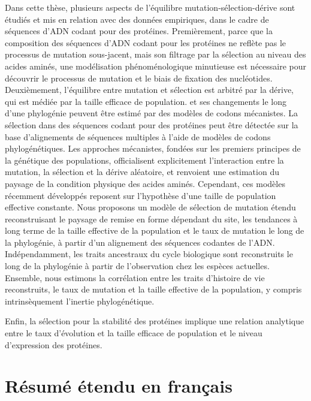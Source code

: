 Dans cette thèse, plusieurs aspects de l'équilibre mutation-sélection-dérive sont étudiés et mis en relation avec des données empiriques, dans le cadre de séquences d'ADN codant pour des protéines.
Premièrement, parce que la composition des séquences d'ADN codant pour les protéines ne reflète pas le processus de mutation sous-jacent, mais son filtrage par la sélection au niveau des acides aminés, une modélisation phénoménologique minutieuse est nécessaire pour découvrir le processus de mutation et le biais de fixation des nucléotides.
Deuxièmement, l'équilibre entre mutation et sélection est arbitré par la dérive, qui est médiée par la taille efficace de population. et ses changements le long d'une phylogénie peuvent être estimé par des modèles de codons mécanistes.
La sélection dans des séquences codant pour des protéines peut être détectée sur la base d'alignements de séquences multiples à l'aide de modèles de codons phylogénétiques.
Les approches mécanistes, fondées sur les premiers principes de la génétique des populations, officialisent explicitement l'interaction entre la mutation, la sélection et la dérive aléatoire, et renvoient une estimation du paysage de la condition physique des acides aminés.
Cependant, ces modèles récemment développés reposent sur l'hypothèse d'une taille de population effective constante.
Nous proposons un modèle de sélection de mutation étendu reconstruisant le paysage de remise en forme dépendant du site, les tendances à long terme de la taille effective de la population et le taux de mutation le long de la phylogénie, à partir d'un alignement des séquences codantes de l'ADN.
Indépendamment, les traits ancestraux du cycle biologique sont reconstruits le long de la phylogénie à partir de l'observation chez les espèces actuelles.
Ensemble, nous estimons la corrélation entre les traits d'histoire de vie reconstruits, le taux de mutation et la taille effective de la population, y compris intrinsèquement l'inertie phylogénétique.

Enfin, la sélection pour la stabilité des protéines implique une relation analytique entre le taux d'évolution et la taille efficace de population et le niveau d'expression des protéines.

\section*{Résumé étendu en français}

